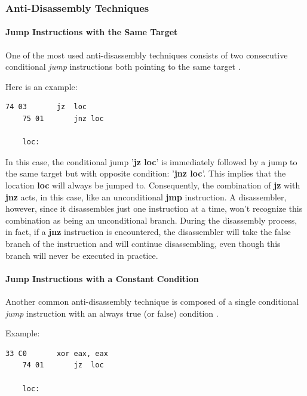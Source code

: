 \documentclass[pdfa%
,cucitura%
]{toptesi}
\begin{document}
\subsubsection{Anti-Disassembly Techniques}

\paragraph{Jump Instructions with the Same Target}
One of the most used anti-disassembly techniques consists of two consecutive conditional \textit{jump} instructions both pointing to the same target \cite{SikorskiPMA}.

Here is an example:
\begin{lstlisting}[caption={Jump Instructions with the Same Target}, label=code:JumpSameTarget, language={[x86masm]Assembler}, style=mystyle]
	74 03		jz 	loc
	75 01		jnz	loc
	
	loc:
\end{lstlisting}

In this case, the conditional jump '\textbf{jz loc}' is immediately followed by a jump to the same target but with opposite condition: '\textbf{jnz loc}'. This implies that the location \textbf{loc} will always be jumped to.
Consequently, the combination of \textbf{jz} with \textbf{jnz} acts, in this case, like an unconditional \textbf{jmp} instruction. A disassembler, however, since it disassembles just one instruction at a time, won't recognize this combination as being an unconditional branch. During the disassembly process, in fact, if a \textbf{jnz} instruction is encountered, the disassembler will take the false branch of the instruction and will continue disassembling, even though this branch will never be executed in practice.

\paragraph{Jump Instructions with a Constant Condition}
Another common anti-disassembly technique is composed of a single conditional \textit{jump} instruction with an always true (or false) condition \cite{SikorskiPMA}.

Example:
\begin{lstlisting}[caption={Jump Instructions with a Constant Condition example}, label=code:JumpConstant, language={[x86masm]Assembler}, style=mystyle]
	33 C0		xor	eax, eax
	74 01		jz 	loc
	
	loc:
\end{lstlisting}
\end{document}
